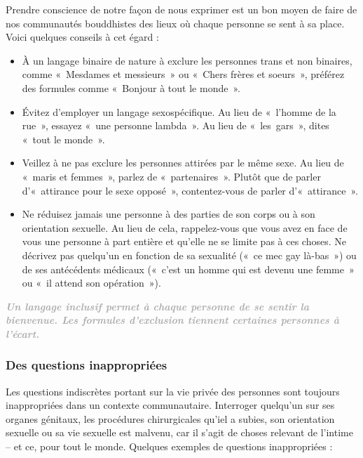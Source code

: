 \documentclass[12pt,openany]{book}
\renewenvironment{quote}{%
  \list{}{%
    \leftmargin-0.1cm   %
    \rightmargin\leftmargin
  }
  \item\relax
}
{\endlist}
\begin{document}
\noindent Prendre conscience de notre façon de nous exprimer est un bon moyen de faire de nos communautés bouddhistes des lieux où chaque personne se sent à sa place. Voici quelques conseils à cet égard :

\begin{itemize}[label=\textbullet, leftmargin=*]
\setlength\itemsep{-0.3em}
\item À un langage binaire de nature à exclure les personnes trans et non binaires, comme \mbox{« M}esdames et messieur\mbox{s »} ou \mbox{« C}hers frères et soeur\mbox{s »}, préférez des formules comme \mbox{« B}onjour à tout le mond\mbox{e »}.
\item Évitez d’employer un langage sexospécifique. Au lieu de \mbox{« l}’homme de la ru\mbox{e »}, essayez \mbox{« u}ne personne lambd\mbox{a »}. Au lieu de \mbox{« les gars »}, dites \mbox{« t}out le mond\mbox{e »}.
\item Veillez à ne pas exclure les personnes attirées par le même sexe. Au lieu de \mbox{« m}aris et femme\mbox{s »}, parlez de \mbox{« partenaires »}. Plutôt que de parler d’\mbox{« a}ttirance pour le sexe oppos\mbox{é »}, contentez-vous de parler d’\mbox{« attirance »}.
\item Ne réduisez jamais une personne à des parties de son corps ou à son orientation sexuelle. Au lieu de cela, rappelez-vous que vous avez en face de vous une personne à part entière et qu’elle ne se limite pas à ces choses. Ne décrivez pas quelqu’un en fonction de sa sexualité (\mbox{« c}e mec gay là-ba\mbox{s »}) ou de ses antécédents médicaux (\mbox{« c}’est un homme qui est devenu une femm\mbox{e »} ou \mbox{« i}l attend son opératio\mbox{n »}).
\end{itemize}

\medskip

\begingroup
\begin{quote}
\centering
\textit{\large \textbf{\textcolor{darkgray}{Un langage inclusif permet à chaque personne de se sentir la bienvenue. Les formules d’exclusion tiennent certaines personnes à l’écart.}}}
\end{quote}
\endgroup

\subsubsection*{Des questions inappropriées}

\noindent Les questions indiscrètes portant sur la vie privée des personnes sont toujours inappropriées dans un contexte communautaire. Interroger quelqu’un sur ses organes génitaux, les procédures chirurgicales qu’iel a subies, son orientation sexuelle ou sa vie sexuelle est malvenu, car il s’agit de choses relevant de l’intime – et ce, pour tout le monde.
Quelques exemples de questions inappropriées :
\end{document}
